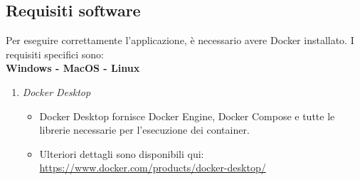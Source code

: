 \subsection{Requisiti software}

Per eseguire correttamente l’applicazione, è necessario avere Docker installato. I requisiti specifici sono:\\

\textbf{Windows - MacOS - Linux}
\begin{enumerate}
    \item \textit{Docker Desktop}
    \begin{itemize}
        \item Docker Desktop fornisce Docker Engine, Docker Compose e tutte le librerie necessarie per l’esecuzione dei container.
        \item Ulteriori dettagli sono disponibili qui: \href{https://www.docker.com/products/docker-desktop/}{https://www.docker.com/products/docker-desktop/}
    \end{itemize}
    
\end{enumerate}
